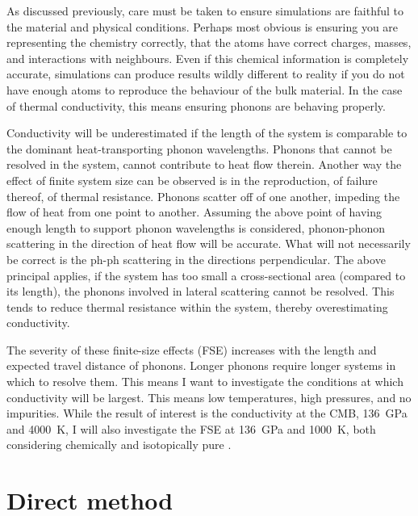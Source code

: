 As discussed previously, care must be taken to ensure simulations are faithful to the material and physical conditions. Perhaps most obvious is ensuring you are representing the chemistry correctly, that the atoms have correct charges, masses, and interactions with neighbours. Even if this chemical information is completely accurate, simulations can produce results wildly different to reality if you do not have enough atoms to reproduce the behaviour of the bulk material. In the case of thermal conductivity, this means ensuring phonons are behaving properly.

Conductivity will be underestimated if the length of the system is comparable to the dominant heat-transporting phonon wavelengths. Phonons that cannot be resolved in the system, cannot contribute to heat flow therein. Another way the effect of finite system size can be observed is in the reproduction, of failure thereof, of thermal resistance. Phonons scatter off of one another, impeding the flow of heat from one point to another. Assuming the above point of having enough length to support phonon wavelengths is considered, phonon-phonon scattering in the direction of heat flow will be accurate. What will not necessarily be correct is the ph-ph scattering in the directions perpendicular. The above principal applies, if the system has too small a cross-sectional area (compared to its length), the phonons involved in lateral scattering cannot be resolved. This tends to reduce thermal resistance within the system, thereby overestimating conductivity.

The severity of these finite-size effects (FSE) increases with the length and expected travel distance of phonons. Longer phonons require longer systems in which to resolve them. This means I want to investigate the conditions at which conductivity will be largest. This means low temperatures, high pressures, and no impurities. While the result of interest is the conductivity at the CMB, 136~GPa and 4000~K, I will also investigate the FSE at 136~GPa  and 1000~K, both considering chemically and isotopically pure \mgsios \bdg.



\section{\label{sec:3.direct}Direct method}

